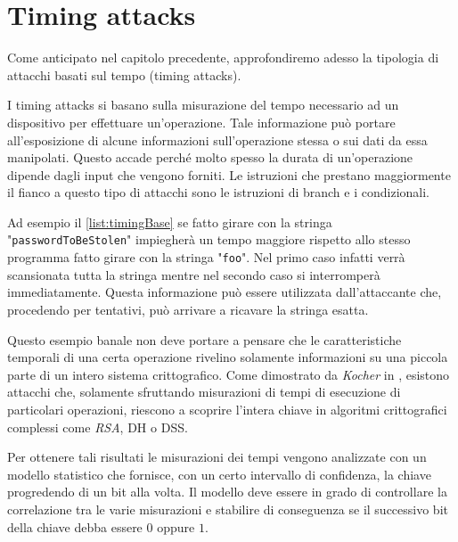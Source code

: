 \chapter{Timing attacks}
Come anticipato nel capitolo precedente, approfondiremo adesso la tipologia di attacchi basati sul tempo (timing attacks). 

I timing attacks si basano sulla misurazione del tempo necessario ad un dispositivo per effettuare un'operazione. Tale informazione può portare all'esposizione di alcune informazioni sull'operazione stessa o sui dati da essa manipolati. Questo accade perché molto spesso la durata di un'operazione dipende dagli input che vengono forniti. Le istruzioni che prestano maggiormente il fianco a questo tipo di attacchi sono le istruzioni di branch e i condizionali.

\begin{center}
	
\end{center}

Ad esempio il \cref{list:timingBase} se fatto girare con la stringa "\texttt{passwordToBeStolen}" impiegherà un tempo maggiore rispetto allo stesso programma fatto girare con la stringa "\texttt{foo}". Nel primo caso infatti verrà scansionata tutta la stringa mentre nel secondo caso si interromperà immediatamente. Questa informazione può essere utilizzata dall'attaccante che, procedendo per tentativi, può arrivare a ricavare la stringa esatta.

Questo esempio banale non deve portare a pensare che le caratteristiche temporali di una certa operazione rivelino solamente informazioni su una piccola parte di un intero sistema crittografico. Come dimostrato da \emph{Kocher} in \cite{kocher1996timing}, esistono attacchi che, solamente sfruttando misurazioni di tempi di esecuzione di particolari operazioni, riescono a scoprire l'intera chiave in algoritmi crittografici complessi come \emph{RSA}, \ac{DH} o \ac{DSS}.

Per ottenere tali risultati le misurazioni dei tempi vengono analizzate con un modello statistico che fornisce, con un certo intervallo di confidenza, la chiave progredendo di un bit alla volta. Il modello deve essere in grado di controllare la correlazione tra le varie misurazioni e stabilire di conseguenza se il successivo bit della chiave debba essere $0$ oppure $1$.


